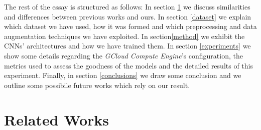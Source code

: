 \documentclass{article}
\begin{document}
The rest of the essay is structured as follows: In section \ref{relwor} we discuss  similarities and differences between previous works and ours. In section \ref{dataset} we explain which dataset we have used, how it was formed and which preprocessing and data augmentation techniques we have exploited. In section\ref{method} we exhibit the CNNs' architectures and how we have trained them. In section \ref{experiments} we show some details regarding the \textit{GCloud Compute Engine}'s configuration, the metrics used to assess the goodness of the models and the detailed results of this experiment. Finally, in section \ref{conclusions} we draw some conclusion and we outline some possibile future works which rely on our result.


\section{Related Works}\label{relwor}
\end{document}

